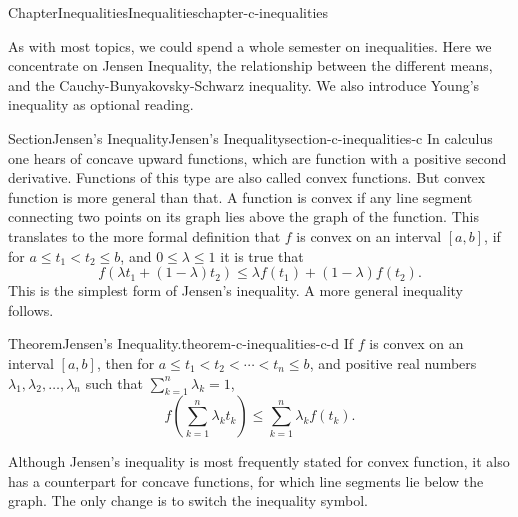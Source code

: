 \documentclass[oneside,10pt,]{book}
\numberwithin{equation}{section}
\newcommand{\lt}{<}
\begin{document}
\begin{chapterptx}{Chapter}{Inequalities}{}{Inequalities}{}{}{chapter-c-inequalities}
\renewcommand*{\chaptername}{Chapter}
\begin{introduction}{}%
As with most topics, we could spend a whole semester on inequalities.  Here we concentrate on Jensen Inequality,  the relationship between the different means, and the Cauchy-Bunyakovsky-Schwarz inequality. We also introduce Young's inequality as optional reading.%
\end{introduction}%
%
%
\typeout{************************************************}
\typeout{************************************************}
%
\begin{sectionptx}{Section}{Jensen's Inequality}{}{Jensen's Inequality}{}{}{section-c-inequalities-c}
%
In calculus one hears of concave upward functions, which are function with a positive second derivative.  Functions of this type are also called convex functions.  But convex function is more general than that.  A function is convex if any line segment connecting two points on its graph lies above the graph of the function. This translates to the more formal definition that \(f\) is convex on an interval \([a,b]\), if for \(a \leq t_1 \lt t_2 \leq b\), and \(0 \leq \lambda \leq 1\) it is true that%
\begin{equation*}
f(\lambda t_1 + (1-\lambda) t_2) \leq \lambda f(t_1)+(1-\lambda)f(t_2).
\end{equation*}
This is the simplest form of Jensen's inequality. A more general inequality follows.%
\begin{theorem}{Theorem}{Jensen's Inequality.}{}{theorem-c-inequalities-c-d}%
%
If \(f\) is convex on an interval \([a,b]\), then for \(a \leq t_1 \lt t_2 \lt \cdots \lt t_n \leq b\), and positive real numbers \(\lambda_1, \lambda_2, \dots, \lambda_n\) such that \(\sum_{k=1}^n \lambda_k =1\),%
\begin{equation*}
f\left(\sum_{k=1}^n \lambda_k t_k \right) \leq  \sum_{k=1}^n \lambda_k  f(t_k).
\end{equation*}
%
\end{theorem}
Although Jensen's inequality is most frequently stated for convex function, it also has a counterpart for concave functions, for which line segments lie below the graph.  The only change is to switch the inequality symbol.%
\end{sectionptx}
%
%
\typeout{************************************************}

\end{chapterptx}
\end{document}
